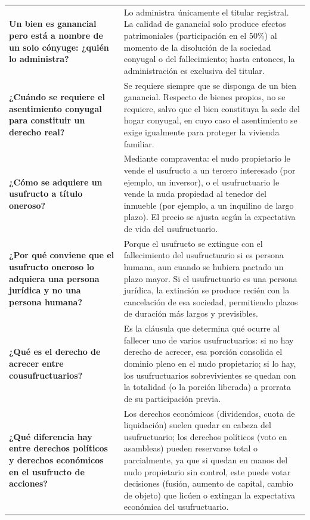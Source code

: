 \documentclass[12pt,oneside]{book}
\begin{document}
\begin{longtable}{
    >{\raggedright\arraybackslash}p{}
    >{\raggedright\arraybackslash}p{}
}
\textbf{Un bien es ganancial pero está a nombre de un solo cónyuge: ¿quién lo administra?} &
Lo administra únicamente el titular registral. La calidad de ganancial solo produce efectos patrimoniales (participación en el 50\%) al momento de la disolución de la sociedad conyugal o del fallecimiento; hasta entonces, la administración es exclusiva del titular. \\

\textbf{¿Cuándo se requiere el asentimiento conyugal para constituir un derecho real?} &
Se requiere siempre que se disponga de un bien ganancial. Respecto de bienes propios, no se requiere, salvo que el bien constituya la sede del hogar conyugal, en cuyo caso el asentimiento se exige igualmente para proteger la vivienda familiar. \\

\textbf{¿Cómo se adquiere un usufructo a título oneroso?} &
Mediante compraventa: el nudo propietario le vende el usufructo a un tercero interesado (por ejemplo, un inversor), o el usufructuario le vende la nuda propiedad al tenedor del inmueble (por ejemplo, a un inquilino de largo plazo). El precio se ajusta según la expectativa de vida del usufructuario. \\

\textbf{¿Por qué conviene que el usufructo oneroso lo adquiera una persona jurídica y no una persona humana?} &
Porque el usufructo se extingue con el fallecimiento del usufructuario si es persona humana, aun cuando se hubiera pactado un plazo mayor. Si el usufructuario es una persona jurídica, la extinción se produce recién con la cancelación de esa sociedad, permitiendo plazos de duración más largos y previsibles. \\

\textbf{¿Qué es el derecho de acrecer entre cousufructuarios?} &
Es la cláusula que determina qué ocurre al fallecer uno de varios usufructuarios: si no hay derecho de acrecer, esa porción consolida el dominio pleno en el nudo propietario; si lo hay, los usufructuarios sobrevivientes se quedan con la totalidad (o la porción liberada) a prorrata de su participación previa. \\

\textbf{¿Qué diferencia hay entre derechos políticos y derechos económicos en el usufructo de acciones?} &
Los derechos económicos (dividendos, cuota de liquidación) suelen quedar en cabeza del usufructuario; los derechos políticos (voto en asambleas) pueden reservarse total o parcialmente, ya que si quedan en manos del nudo propietario sin control, este puede votar decisiones (fusión, aumento de capital, cambio de objeto) que licúen o extingan la expectativa económica del usufructuario. \\


\end{longtable}
\end{document}
